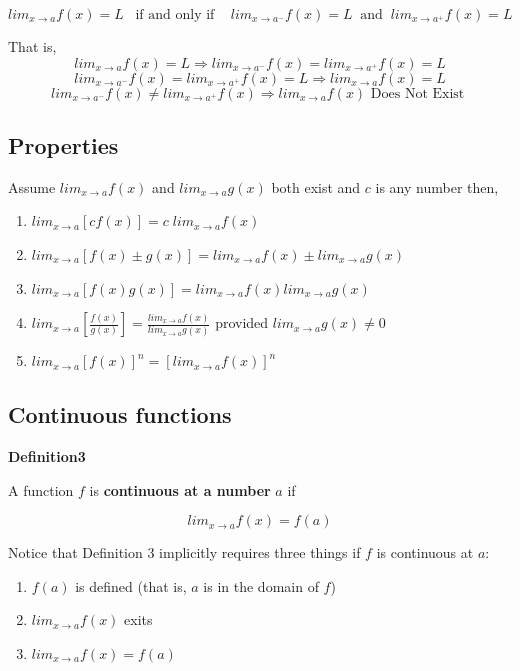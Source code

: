 \documentclass[]{book}
\providecommand{\tightlist}{%
  \setlength{\itemsep}{0pt}\setlength{\parskip}{0pt}}
\begin{document}
\[lim_{x\to a}f(x)=L \;\;\;\text{if and only if }\;\;\; lim_{x\to a^-}f(x)=L \;\;\text{and}\;\; lim_{x\to a^+}f(x)=L\]

That is,
\[lim_{x\to a}f(x)=L \Rightarrow  lim_{x\to a^-}f(x)= lim_{x\to a^+}f(x)=L\]
\[lim_{x\to a^-}f(x)= lim_{x\to a^+}f(x)=L \Rightarrow lim_{x\to a}f(x)=L\]
\[lim_{x\to a^-}f(x) \ne lim_{x\to a^+}f(x) \Rightarrow lim_{x\to a}f(x) \text{ Does Not Exist }\]

\hypertarget{properties}{%
\subsection*{Properties}\label{properties}}

Assume \(lim_{x\to a}f(x)\) and \(lim_{x\to a}g(x)\) both exist and \(c\) is any number then,

\begin{enumerate}
\def\labelenumi{\arabic{enumi}.}
\item
  \(lim_{x\to a}[cf(x)] = c\;lim_{x\to a}f(x)\)
\item
  \(lim_{x\to a}[f(x) \pm g(x)] = lim_{x\to a}f(x) \pm lim_{x\to a}g(x)\)
\item
  \(lim_{x\to a}[f(x)g(x)] = lim_{x\to a}f(x) lim_{x\to a}g(x)\)
\item
  \(lim_{x\to a}\left[\frac{f(x)}{g(x)}\right] = \frac{lim_{x\to a}f(x)}{lim_{x\to a}g(x)}\) provided \(lim_{x\to a}g(x) \ne 0\)
\item
  \(lim_{x\to a}[f(x)]^n = [lim_{x\to a}f(x)]^n\)
\end{enumerate}

\hypertarget{continuous-functions}{%
\subsection*{Continuous functions}\label{continuous-functions}}

\textbf{Definition3}

A function \(f\) is \textbf{continuous at a number} \(a\) if

\[lim_{x\to a}f(x)=f(a)\]

Notice that Definition 3 implicitly requires three things if \(f\) is continuous at \(a\):

\begin{enumerate}
\def\labelenumi{\arabic{enumi}.}
\tightlist
\item
  \(f(a)\) is defined (that is, \(a\) is in the domain of \(f\))
\item
  \(lim_{x\to a}f(x)\) exits
\item
  \(lim_{x\to a}f(x) = f(a)\)
\end{enumerate}
\end{document}
